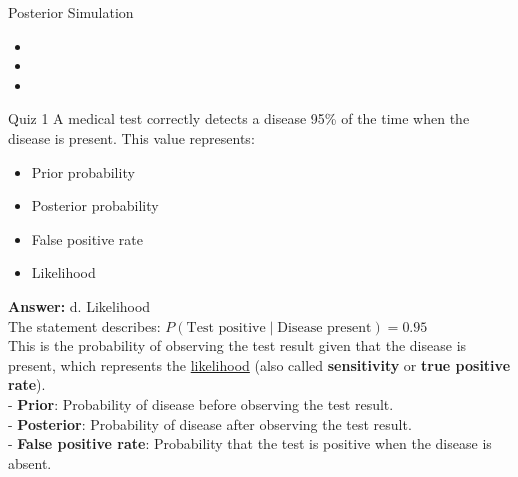 \documentclass[12pt]{beamer}
\begin{document}
\begin{frame}{}
\begin{block}{Posterior Simulation}
\begin{itemize}
\item 
\item 
\item 
\end{itemize}
\end{block}
\end{frame}

{
\begin{frame}{}
\begin{block}{Quiz 1}
A medical test correctly detects a disease 95\% of the time when the disease is present.
This value represents:
\begin{itemize}
\item[a.] Prior probability
\item[b.] Posterior probability
\item[c.] False positive rate
\item[d.] Likelihood
\end{itemize}
\end{block}
\end{frame}

\begin{frame}{}
\textbf{Answer:}
{\color{blue}
d. Likelihood\\

The statement describes: $P(\text{Test positive} \mid \text{Disease present}) = 0.95$\\

This is the probability of observing the test result given that the disease is present, 
which represents the \ul{likelihood} (also called \textbf{sensitivity} or \textbf{true positive rate}).\\

- \textbf{Prior}: Probability of disease before observing the test result.\\
- \textbf{Posterior}: Probability of disease after observing the test result.\\
- \textbf{False positive rate}: Probability that the test is positive when the disease is absent.
}
\end{frame}

}
\end{document}
